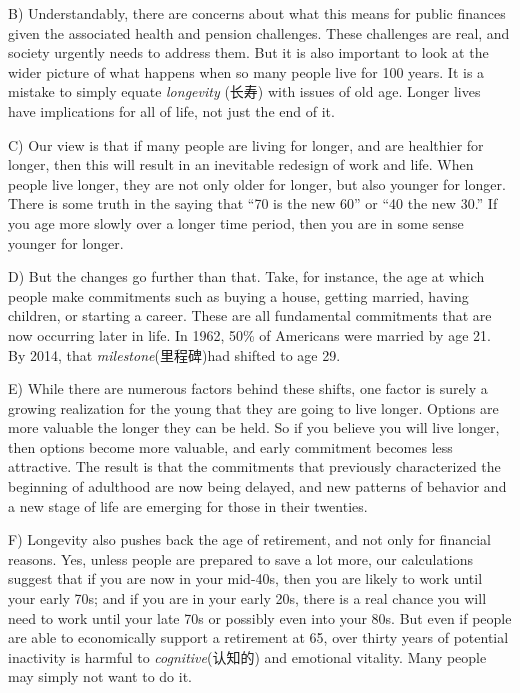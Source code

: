 \documentclass[UTF8,11pt]{ctexart}
\begin{document}
B) Understandably, there are concerns about what this means for public finances given the associated health and pension challenges. These challenges are real, and society urgently needs to address them. But it is also important to look at the wider picture of what happens when so many people live for 100 years. It is a mistake to simply equate\textit{ longevity} (长寿) with issues of old age. Longer lives have implications for all of life, not just the end of it.


C) Our view is that if many people are living for longer, and are healthier for longer, then this will result in an inevitable redesign of work and life. When people live longer, they are not only older for longer, but also younger for longer. There is some truth in the saying that “70 is the new 60” or “40 the new 30.” If you age more slowly over a longer time period, then you are in some sense younger for longer.


D) But the changes go further than that. Take, for instance, the age at which people make commitments such as buying a house, getting married, having children, or starting a career. These are all fundamental commitments that are now occurring later in life. In 1962, 50\% of Americans were married by age 21. By 2014, that \textit{milestone}(里程碑)had shifted to age 29.


E) While there are numerous factors behind these shifts, one factor is surely a growing realization for the young that they are going to live longer. Options are more valuable the longer they can be held. So if you believe you will live longer, then options become more valuable, and early commitment becomes less attractive. The result is that the commitments that previously characterized the beginning of adulthood are now being delayed, and new patterns of behavior and a new stage of life are emerging for those in their twenties.


F) Longevity also pushes back the age of retirement, and not only for financial reasons. Yes, unless people are prepared to save a lot more, our calculations suggest that if you are now in your mid-40s, then you are likely to work until your early 70s; and if you are in your early 20s, there is a real chance you will need to work until your late 70s or possibly even into your 80s. But even if people are able to economically support a retirement at 65, over thirty years of potential inactivity is harmful to\textit{ cognitive}(认知的) and emotional vitality. Many people may simply not want to do it.
\end{document}
